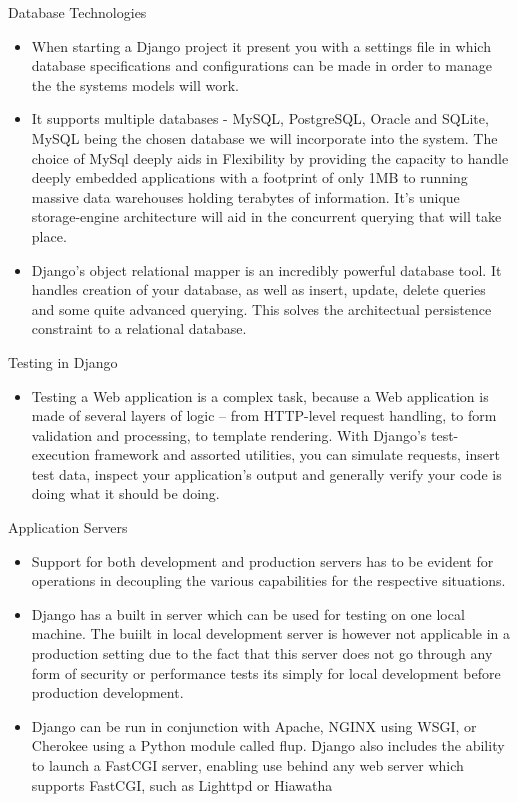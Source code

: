 \documentclass[12pt]{article}
\begin{document}
					 Database Technologies
					\begin{itemize}
						\item When starting a Django project it present you with a settings file in which database specifications and configurations can be made in order to manage the the systems models will work.
						\item It supports multiple databases - MySQL, PostgreSQL, Oracle and SQLite, MySQL being the chosen database we will incorporate into the system. The choice of MySql deeply aids in Flexibility by providing the capacity to handle deeply embedded applications with a footprint of only 1MB to running massive data warehouses holding terabytes of information. It's unique storage-engine architecture will aid in the concurrent querying that will take place.
						\item Django's object relational mapper is an incredibly powerful database tool. It handles creation of your database, as well as insert, update, delete queries and some quite advanced querying. This solves the architectual persistence constraint to a relational database.
						
					\end{itemize}
					 
					 Testing in Django
					\begin{itemize}
						\item Testing a Web application is a complex task, because a Web application is made of several layers of logic – from HTTP-level request handling, to form validation and processing, to template rendering. With Django’s test-execution framework and assorted utilities, you can simulate requests, insert test data, inspect your application’s output and generally verify your code is doing what it should be doing.
						
					\end{itemize}
					
					 Application Servers
					\begin{itemize}
						\item Support for both development and production servers has to be evident for operations in decoupling the various capabilities for the respective situations. 
						\item Django has a built in server which can be used for testing on one local machine. The buiilt in local development server is however not applicable in a production setting due to the fact that this server does not go through any form of security or performance tests its simply for local development before production development.
						\item Django can be run in conjunction with Apache, NGINX using WSGI, or Cherokee using a Python module called flup. Django also includes the ability to launch a FastCGI server, enabling use behind any web server which supports FastCGI, such as Lighttpd or Hiawatha
					\end{itemize}
		
\end{document}
